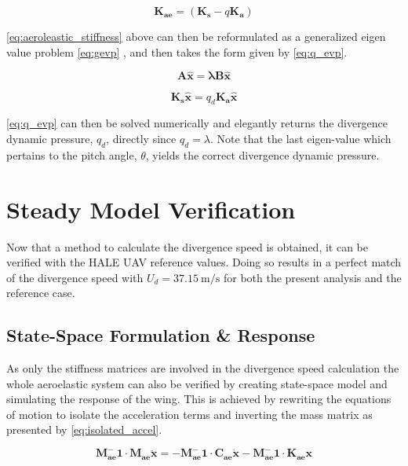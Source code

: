 \begin{equation}
    \label{eq:aeroleastic_stiffness}
    \bm{K_{ae}} = \left(\bm{K_{s}} - q \bm{K_a}\right)
\end{equation}

\cref{eq:aeroleastic_stiffness} above can then be reformulated as a generalized
eigen value problem
\cref{eq:gevp} \autocite[p.652]{zienkiewiczFiniteElementMethod2013}, and then
takes the form given by \cref{eq:q_evp}.

\begin{equation}
    \label{eq:gevp}
    \bm{A}\bm{\hat{x}} = \bm{\lambda}\bm{B}\bm{\hat{x}}
\end{equation}

\begin{equation}
    \label{eq:q_evp}
    \bm{K_s}\bm{\hat{x}} = q_{d}\bm{K_a}\bm{\hat{x}}
\end{equation}

\cref{eq:q_evp} can then be solved numerically and elegantly returns the
divergence dynamic pressure, $q_{d}$, directly since $q_{d} = \lambda$. Note
that the last eigen-value which pertains to the pitch angle, $\theta$, yields
the correct divergence dynamic pressure.

\section{Steady Model Verification}
Now that a method to calculate the divergence speed is obtained, it can be
verified with the HALE UAV reference values. Doing so results in a perfect
match of the divergence speed with $\boxed{U_d=\SI{37.15}{\meter\per\second}}$
for both the present analysis and the reference case.

\subsection{State-Space Formulation \& Response}
As only the stiffness matrices are involved in the divergence speed calculation
the whole aeroelastic system can also be verified by creating state-space
model and simulating the response of the wing. This is achieved by rewriting
the equations of motion to isolate the acceleration terms and inverting
the mass matrix as presented by \cref{eq:isolated_accel}.

\begin{equation}
    \label{eq:isolated_accel}
    \bm{M_{ae}^-1\cdot M_{ae}\ddot{x}} =
    -\bm{M_{ae}^-1\cdot C_{ae}\dot{x}}
    -\bm{M_{ae}^-1\cdot K_{ae}x}
\end{equation}

